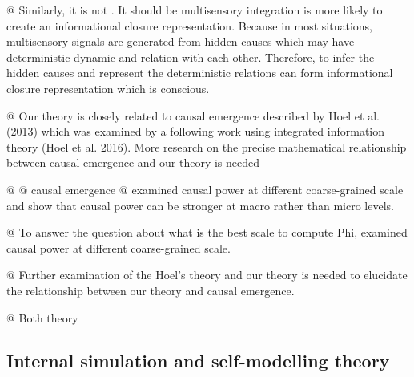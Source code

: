 \documentclass[utf8]{article}
\begin{document}
\begin{WritingMaterials}
			@ Similarly, it is not . It should be multisensory integration is more likely to create an informational closure representation. Because in most situations, multisensory signals are generated from hidden causes which may have deterministic dynamic and relation with each other. Therefore, to infer the hidden causes and represent the deterministic relations can form informational closure representation which is conscious.

				
		    @ Our theory is closely related to causal emergence described by Hoel et al. (2013) which was examined by a following work using integrated information theory (Hoel et al. 2016). More research on the precise mathematical relationship between causal emergence and our theory is needed
		    
			@ \cite{hoel2016can}
			@ causal emergence
			@ \cite{hoel2013quantifying} examined causal power at different coarse-grained scale and show that causal power can be stronger at macro rather than micro levels.


			@ To answer the question about what is the best scale to compute Phi, \cite{hoel2016can} examined causal power at different coarse-grained scale.

			@ Further examination of the Hoel's theory and our theory is needed to elucidate the relationship between our theory and causal emergence.
			
			@ Both theory 


			\end{WritingMaterials}

        
		\subsection{Internal simulation and self-modelling theory}



\end{document}
